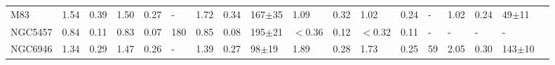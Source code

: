 \documentclass[legal,11pt]{article}
\begin{document}
\begin{landscape}
\begin{table}
\begin{tabular}{l l l l l l l l l l l l l l l l l l }
M83        & 1.54    & 0.39    & 1.50    & 0.27    & -         & 1.72    & 0.34    & 167$\pm$35    & 1.09    & 0.32    & 1.02    & 0.24    & -         & 1.02    & 0.24    & 49$\pm$11     \\
NGC5457    & 0.84    & 0.11    & 0.83    & 0.07    & 180       & 0.85    & 0.08    & 195$\pm$21    & $<$0.36 & 0.12    & $<$0.32 & 0.11    & -         & -       & -       & -             \\
NGC6946    & 1.34    & 0.29    & 1.47    & 0.26    & -         & 1.39    & 0.27    & 98$\pm$19     & 1.89    & 0.28    & 1.73    & 0.25    & 59        & 2.05    & 0.30    & 143$\pm$10    \\
\hline
\end{tabular}
\end{table}
\end{landscape}
\end{document}
